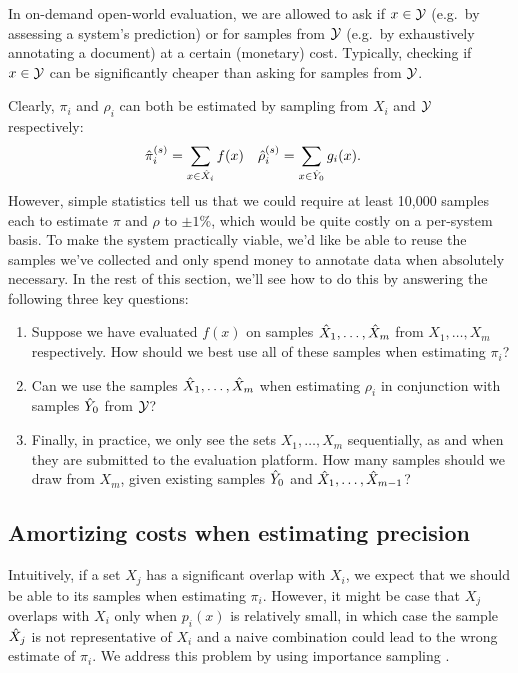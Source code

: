 In on-demand open-world evaluation, we are allowed to ask if $x \in \mathcal{Y}$ (e.g.\ by assessing a system's prediction) or for samples from $\mathcal{Y}$ (e.g.\ by exhaustively annotating a document) at a certain (monetary) cost.
Typically, checking if $x \in \mathcal{Y}$ can be significantly cheaper than asking for samples from $\mathcal{Y}$.

Clearly, $\pi_i$ and $\rho_i$ can both be estimated by sampling from $X_i$ and $\mathcal{Y}$ respectively:
\begin{align*}
  {\hat{\pi}}_i^{(s)} &= \sum_{x \in {\hat{X}}_i} f(x) & {\hat{\rho}}_i^{(s)} &= \sum_{x \in {\hat{Y}}_0} g_i(x).
\end{align*}
However, simple statistics tell us that we could require at least 10,000 samples each to estimate $\pi$ and $\rho$ to $\pm 1\%$, which would be quite costly on a per-system basis.
To make the system practically viable, we'd like be able to reuse the samples we've collected and only spend money to annotate data when absolutely necessary.
In the rest of this section, we'll see how to do this by answering the following three key questions:
\begin{enumerate}
  \item Suppose we have evaluated $f(x)$ on samples ${\hat{X}}_1, \ldots, {\hat{X}}_m$ from $X_1, \ldots, X_m$ respectively. How should we best use all of these samples when estimating $\pi_i$?
  \item 
    Can we use the samples ${\hat{X}}_1, \ldots, {\hat{X}}_m$ when estimating $\rho_i$ in conjunction with samples ${\hat{Y}}_0$ from $\mathcal{Y}$?
  \item Finally, in practice, we only see the sets $X_1, \ldots, X_m$ sequentially, as and when they are submitted to the evaluation platform. How many samples should we draw from $X_m$, given existing samples ${\hat{Y}}_0$ and ${\hat{X}}_1, \ldots, {\hat{X}}_{m-1}$?
\end{enumerate}

\subsection{Amortizing costs when estimating precision}

Intuitively, if a set $X_j$ has a significant overlap with $X_i$, we expect that we should be able to its samples when estimating $\pi_i$.
However, it might be case that $X_j$ overlaps with $X_i$ only when $p_i(x)$ is relatively small, in which case the sample ${\hat{X}}_j$ is not representative of $X_i$ and a naive combination could lead to the wrong estimate of $\pi_i$.
We address this problem by using importance sampling \citep{owen2013monte}.

